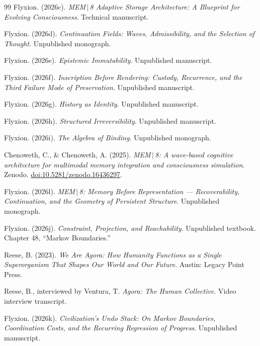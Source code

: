 \documentclass[11pt]{article}
\begin{document}
\begin{thebibliography}{99}
Flyxion. (2026c). \emph{MEM\,$|$\,8 Adaptive Storage Architecture: A Blueprint for Evolving Consciousness}. Technical manuscript.

Flyxion. (2026d). \emph{Continuation Fields: Waves, Admissibility, and the Selection of Thought}. Unpublished monograph.

Flyxion. (2026e). \emph{Epistemic Immutability}. Unpublished manuscript.

Flyxion. (2026f). \emph{Inscription Before Rendering: Custody, Recurrence, and the Third Failure Mode of Preservation}. Unpublished manuscript.

Flyxion. (2026g). \emph{History as Identity}. Unpublished manuscript.

Flyxion. (2026h). \emph{Structured Irreversibility}. Unpublished manuscript.

Flyxion. (2026i). \emph{The Algebra of Binding}. Unpublished monograph.

Chenoweth, C., \& Chenoweth, A. (2025). \emph{MEM\,$|$\,8: A wave-based cognitive architecture for multimodal memory integration and consciousness simulation}. Zenodo. \href{https://doi.org/10.5281/zenodo.16436297}{doi:10.5281/zenodo.16436297}.

Flyxion. (2026l). \emph{MEM\,$|$\,8: Memory Before Representation --- Recoverability, Continuation, and the Geometry of Persistent Structure}. Unpublished monograph.

Flyxion. (2026j). \emph{Constraint, Projection, and Reachability}. Unpublished textbook. Chapter 48, ``Markov Boundaries.''

Reese, B. (2023). \emph{We Are Agora: How Humanity Functions as a Single Superorganism That Shapes Our World and Our Future}. Austin: Legacy Point Press.

Reese, B., interviewed by Ventura, T. \emph{Agora: The Human Collective}. Video interview transcript.

Flyxion. (2026k). \emph{Civilization's Undo Stack: On Markov Boundaries, Coordination Costs, and the Recurring Regression of Progress}. Unpublished manuscript.

\end{thebibliography}
\end{document}
